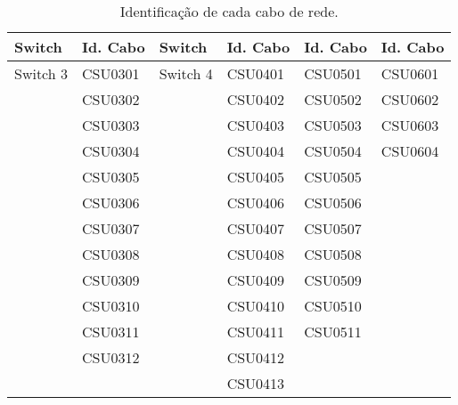 \begin{table}[h!]
	\centering
	\caption{Identificação de cada cabo de rede.}
	\label{tab6} %
\begin{tabular}{|l|l|l|l|l|l|}
\hline
Switch   & Id. Cabo & Switch   & Id. Cabo & Id. Cabo & Id. Cabo \\ \hline
Switch 3 & CSU0301  & Switch 4 & CSU0401  & CSU0501  & CSU0601  \\ \hline
         & CSU0302  &          & CSU0402  & CSU0502  & CSU0602  \\ \hline
         & CSU0303  &          & CSU0403  & CSU0503  & CSU0603  \\ \hline
         & CSU0304  &          & CSU0404  & CSU0504  & CSU0604  \\ \hline
         & CSU0305  &          & CSU0405  & CSU0505  &          \\ \hline
         & CSU0306  &          & CSU0406  & CSU0506  &          \\ \hline
         & CSU0307  &          & CSU0407  & CSU0507  &          \\ \hline
         & CSU0308  &          & CSU0408  & CSU0508  &          \\ \hline
         & CSU0309  &          & CSU0409  & CSU0509  &          \\ \hline
         & CSU0310  &          & CSU0410  & CSU0510  &          \\ \hline
         & CSU0311  &          & CSU0411  & CSU0511  &          \\ \hline
         & CSU0312  &          & CSU0412  &          &          \\ \hline
         &          &          & CSU0413  &          &          \\ \hline
\end{tabular}
\end{table}


















